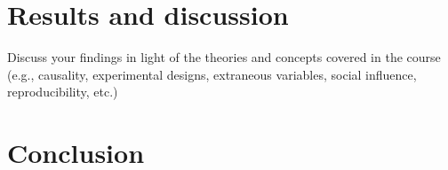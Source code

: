 \documentclass[fleqn,12pt]{article}
\begin{document}
\section{Results and discussion}

Discuss your findings in light of the theories and concepts covered in the course (e.g., causality, experimental designs,
extraneous variables, social influence, reproducibility, etc.)
\section{Conclusion}


 \newpage 


\end{document}
